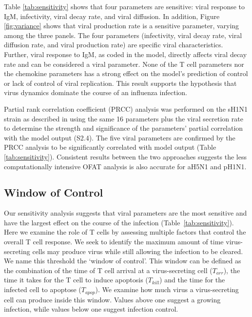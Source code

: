 \documentclass[preprint,10pt,numbers]{elsarticle}
\begin{document}
Table \ref{tab:sensitivity} shows that four parameters are sensitive: viral response to IgM, infectivity, viral decay rate, and viral diffusion.  In addition, Figure \ref{fig:variance} shows that viral production rate is a sensitive parameter, varying among the three panels.  The four parameters (infectivity, viral decay rate, viral diffusion rate, and viral production rate) are specific viral characteristics.  Further, viral response to IgM, as coded in the model, directly affects viral decay rate and can be considered a viral parameter.  None of the T cell parameters nor the chemokine parameters has a strong effect on the model's prediction of control or lack of control of viral replication.  This result supports the hypothesis that virus dynamics dominate the course of an influenza infection.  

Partial rank correlation coefficient (PRCC) analysis was performed on the sH1N1 strain as described in \cite{Marino2008} using the same 16 parameters plus the viral secretion rate to determine the strength and significance of the parameters' partial correlation with the model output (S2.4).  The  five viral parameters are confirmed by the PRCC analysis to be significantly correlated with model output (Table \ref{tab:sensitivity}).  Consistent results between the two approaches suggests the less computationally intensive OFAT analysis is also accurate for aH5N1 and pH1N1.

\subsection*{Window of Control}

Our sensitivity analysis suggests that viral parameters are the most sensitive and have the largest effect on the course of the infection (Table~\ref{tab:sensitivity}).  Here we examine the role of T cells by assessing multiple factors that control the overall T cell response.  We seek to identify the maximum amount of time virus-secreting cells may produce virus while still allowing the infection to be cleared.  We name this threshold the `window of control'.  This window can be defined as the combination of the time of T cell arrival at a virus-secreting cell ($T_{arr}$), the time it takes for the T cell to induce apoptosis ($T_{kill}$) and the time for the infected cell to apoptose ($T_{apop}$).  We examine how much virus a virus-secreting cell can produce inside this window.  Values above one suggest a growing infection, while values below one suggest infection control.
\end{document}
